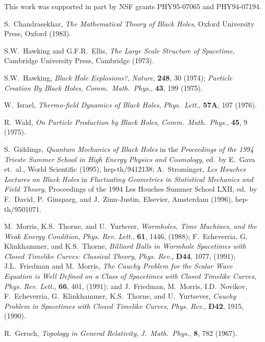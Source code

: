 \acknowledgments

This work was supported in part by NSF grants PHY95-07065 and
PHY94-07194.


\begin{references}

 S.~Chandrasekhar,
 {\sl The Mathematical Theory of Black Holes}, Oxford University Press,
Oxford (1983).

 S.W.~Hawking and G.F.R.~Ellis, {\sl The Large Scale
Structure of Spacetime}, Cambridge University Press, Cambridge (1973).

  S.W.~Hawking, {\it Black Hole Explosions?}, {\sl Nature}, {\bf 248}, 30 (1974); 
{\it Particle Creation By Black Holes},
{\sl Comm.~Math.~Phys.}, {\bf 43}, 199 (1975). 

 W.~Israel, {\it Thermo-field Dynamics of Black Holes},
{\sl Phys.~Lett.}, {\bf 57A}, 107 (1976).

 R.~Wald, {\it On Particle Production by Black Holes},
{\sl Comm.~Math.~Phys.}, {\bf 45}, 9 (1975).

 S.~Giddings, {\it Quantum Mechanics of Black Holes} in
the {\sl Proceedings of the 1994 Trieste Summer School in High Energy
Physics and Cosmology}, ed.~by E.~Gava et.~al., World Scientific
(1995), hep-th/9412138; A.~Strominger, {\it Les Houches Lectures on
Black Holes} in {\sl Fluctuating Geometries in Statistical Mechanics and
Field Theory}, Proceedings of the 1994 Les Houches Summer School LXII,
ed.~by F.~David, P.~Ginsparg, and J.~Zinn-Justin, Elsevier, Amsterdam
(1996), hep-th/9501071.

 M.~Morris, K.S.~Thorne, and U.~Yurtsver, {\it   Wormholes,
Time Machines, and the Weak Energy Condition},
{\sl Phys.
  Rev. Lett.},
 {\bf 61}, 1446, (1988);  F.~Echeverria, G. Klinkhammer, and
K.S.~Thorne, {\it Billiard Balls in Wormhole Spacetimes with Closed Timelike
 Curves: Classical Theory},
{\sl Phys. Rev.}, {\bf D44}, 1077, (1991);
 J.L.~Friedman and M.~Morris, {\it The Cauchy Problem for the Scalar
 Wave Equation is Well Defined on a Class
     of Spacetimes with Closed Timelike Curves},
 {\sl Phys. Rev. Lett.},
 {\bf 66}, 401, (1991); and  J.~Friedman, M.~Morris, I.D.~Novikov,
F.~Echeverria,
G.~Klinkhammer, K.S.~Thorne, and U.~Yurtsever, {\it Cauchy Problem in
Spacetimes with Closed Timelike Curves},  {\sl Phys. Rev.}, {\bf
D42}, 1915, (1990).


 R.~Geroch, {\it Topology in General Relativity},  {\sl  J.~Math.~Phys.}, {\bf 8}, 782 (1967).


\end{references}
